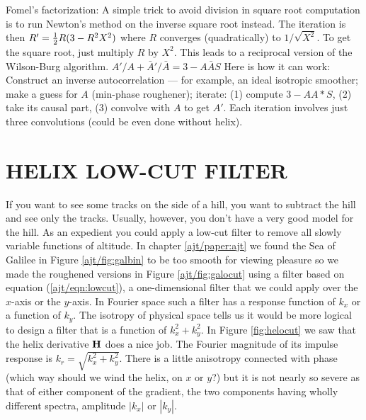 \begin{exer}
\begin{comment}
\item
You hear from three different people
that a more isotropic representation
of the Laplacian is minus one sixth of
$$
\begin{array} {rrr}
-1     & -4 &  -1 \\
-4     & 20 &  -4 \\
-1     & -4 &  -1
\end{array}
$$
What changes need to be made to subroutine \texttt{lapfac()}?
%
\end{comment}
\item
Fomel's factorization:
A simple trick to avoid division in square root computation is to run
Newton's method on the inverse square root instead.
The iteration is then
$R' = {1\over 2} R(3-R^2 X^2)$
where $R$ converges (quadratically) to $1/\sqrt{X^2}$.
To get the square root, just multiply $R$ by $X^2$.
This leads to a reciprocal version of the Wilson-Burg algorithm.
$A'/A + \bar A'/ \bar A = 3 - A \bar A  S $
Here is how it can work:
Construct an inverse autocorrelation ---
for example,
an ideal isotropic smoother;
make a guess for $A$ (min-phase roughener); iterate:
(1) compute $3 - A A* S$,
(2) take its causal part,
(3) convolve with $A$ to get $A'$.
Each iteration involves just three convolutions
(could be even done without helix).
\end{exer}


\section{HELIX LOW-CUT FILTER}
If you want to see some tracks on the side of a hill,
you want to subtract the hill and see only the tracks.
Usually, however, you don't have a very good model for the hill.
As an 
expedient you could apply a low-cut filter to remove all
slowly variable functions of altitude.
In chapter \ref{ajt/paper:ajt} we found the Sea of Galilee
in Figure \ref{ajt/fig:galbin} to be too smooth for viewing pleasure
so we made the roughened versions
in Figure \ref{ajt/fig:galocut}
using a filter based
on equation (\ref{ajt/eqn:lowcut}),
a one-dimensional filter that we could apply
over the $x$-axis or the $y$-axis.
In Fourier space such a filter has a response function of $k_x$
or a function of $k_y$.
The isotropy of physical space tells us
it would be more logical to design a filter that
is a function of
$k_x^2+k_y^2$.
In Figure \ref{fig:helocut} we saw that the helix derivative
$\bold H$
does a nice job.
The Fourier magnitude of its impulse response is $k_r=\sqrt{k_x^2+k_y^2}$.
There is a little anisotropy connected with phase (which way should
we wind the helix, on $x$ or $y$?) but it is
not nearly so severe as that of either component of the gradient,
the two components having wholly different spectra,
amplitude $|k_x|$ or $|k_y|$.

